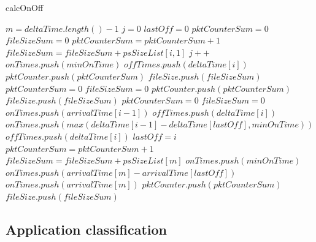 \begin{algorithm}[ht!]
\caption{calcOnOff}
\begin{algorithmic}[1]
    \State $m = deltaTime.length() - 1$
    \State $j = 0$
    \State $lastOff = 0$
    \State $pktCounterSum = 0$
    \State $fileSizeSum = 0$
    	\State $pktCounterSum = pktCounterSum + 1$
		\State $fileSizeSum = fileSizeSum + psSizeList[i, 1]$
    	 
        	\State $j++$
            \State $onTimes.push(minOnTime)$
            \State $offTimes.push(deltaTime[i])$
            	\State $pktCounter.push(pktCounterSum)$
				\State $fileSize.push(fileSizeSum)$
				\State $pktCounterSum = 0$
				\State $fileSizeSum = 0$
            \Else {} 
            	\State $pktCounter.push(pktCounterSum)$
				\State $fileSize.push(fileSizeSum)$
				\State $pktCounterSum = 0$
				\State $fileSizeSum = 0$
                	\State $onTimes.push(arrivalTime[i - 1])$
					\State $offTimes.push(deltaTime[i])$
                \Else {} 
					\State  $onTimes.push(max(deltaTime[i-1] - deltaTime[lastOff], minOnTime))$ 
					\State  $offTimes.push(deltaTime[i])$
                \EndIf
                \State $lastOff = i$
            \EndIf        
    \EndFor
    \State $pktCounterSum = pktCounterSum + 1$
	\State $fileSizeSum = fileSizeSum + psSizeList[m]$
     
		\State $onTimes.push(minOnTime)$ %
	\Else {}
		\State $onTimes.push(arrivalTime[m] - arrivalTime[lastOff])$ 
		\Else 
		\State $onTimes.push(arrivalTime[m])$ 
		\EndIf
	\EndIf
    \State $pktCounter.push(pktCounterSum)$
	\State $fileSize.push(fileSizeSum)$
    \EndFunction
\end{algorithmic}
\end{algorithm}


\subsection{Application classification}

